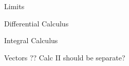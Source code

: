 \documentclass{article}
\begin{document}
Limits

Differential Calculus

Integral Calculus

Vectors ?? Calc II should be separate?
\end{document}
